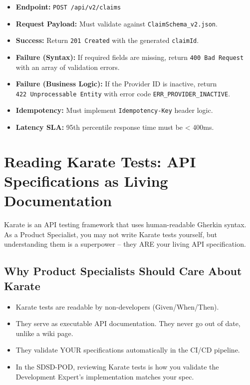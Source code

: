 \documentclass[
  11pt,
  openany,
  oneside]{book}
\providecommand{\tightlist}{%
  \setlength{\itemsep}{0pt}\setlength{\parskip}{0pt}}
\begin{document}
\begin{itemize}
\tightlist
\item
  \textbf{Endpoint:} \texttt{POST\ /api/v2/claims}
\item
  \textbf{Request Payload:} Must validate against
  \texttt{ClaimSchema\_v2.json}.
\item
  \textbf{Success:} Return \texttt{201\ Created} with the generated
  \texttt{claimId}.
\item
  \textbf{Failure (Syntax):} If required fields are missing, return
  \texttt{400\ Bad\ Request} with an array of validation errors.
\item
  \textbf{Failure (Business Logic):} If the Provider ID is inactive,
  return \texttt{422\ Unprocessable\ Entity} with error code
  \texttt{ERR\_PROVIDER\_INACTIVE}.
\item
  \textbf{Idempotency:} Must implement \texttt{Idempotency-Key} header
  logic.
\item
  \textbf{Latency SLA:} 95th percentile response time must be
  \textless{} 400ms.
\end{itemize}

\section{Reading Karate Tests: API Specifications as Living
Documentation}\label{reading-karate-tests-api-specifications-as-living-documentation}

Karate is an API testing framework that uses human-readable Gherkin
syntax. As a Product Specialist, you may not write Karate tests
yourself, but understanding them is a superpower -- they ARE your living
API specification.

\subsection{Why Product Specialists Should Care About
Karate}\label{why-product-specialists-should-care-about-karate}

\begin{itemize}
\tightlist
\item
  Karate tests are readable by non-developers (Given/When/Then).
\item
  They serve as executable API documentation. They never go out of date,
  unlike a wiki page.
\item
  They validate YOUR specifications automatically in the CI/CD pipeline.
\item
  In the SDSD-POD, reviewing Karate tests is how you validate the
  Development Expert's implementation matches your spec.
\end{itemize}
\end{document}
